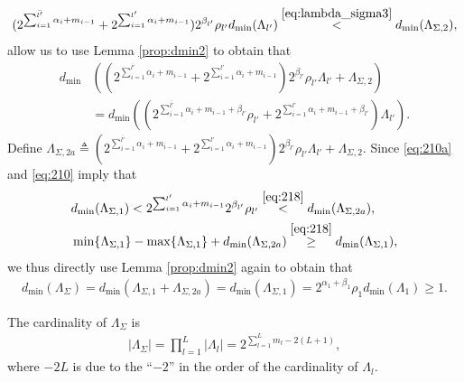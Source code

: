 \documentclass[12pt, draftclsnofoot, onecolumn]{IEEEtran}
\theoremstyle{definition}
\begin{document}
\begin{align}\label{eq:217}
(2^{\sum_{i=1}^{\bar{l'}}\alpha_i+m_{i-1}}+2^{\sum_{i=1}^{l'}\alpha_i+m_{i-1}})2^{\beta_{l'}}\rho_{l'}d_{\min}(\Lambda_{l'})\overset{\eqref{eq:lambda_sigma3}}{<}d_{\min}(\Lambda_{\Sigma,2}),
\end{align}
allow us to use Lemma \ref{prop:dmin2} to obtain that
\begin{align}\label{eq:218}
d_{\min}&\left( (2^{\sum_{i=1}^{\bar{l'}}\alpha_i+m_{i-1}}+2^{\sum_{i=1}^{l'}\alpha_i+m_{i-1}})2^{\beta_{l'}}\rho_{l'}\Lambda_{l'}+ \Lambda_{\Sigma,2}\right) \nonumber \\
&= d_{\min}\left((2^{\sum_{i=1}^{\bar{l'}}\alpha_i+m_{i-1}+\beta_{l'}}\rho_{l'}+2^{\sum_{i=1}^{l'}\alpha_i+m_{i-1}+\beta_{l'}})\Lambda_{l'}\right).
\end{align}
Define $\Lambda_{\Sigma,2a}\triangleq (2^{\sum_{i=1}^{\bar{l'}}\alpha_i+m_{i-1}}+2^{\sum_{i=1}^{l'}\alpha_i+m_{i-1}})2^{\beta_{l'}}\rho_{l'}\Lambda_{l'}+ \Lambda_{\Sigma,2}$. Since \eqref{eq:210a} and \eqref{eq:210} imply that
\begin{align}
&d_{\min}(\Lambda_{\Sigma,1}) <2^{\sum_{i=1}^{l'}\alpha_i+m_{i-1}}2^{\beta_{l'}}\rho_{l'}\overset{\eqref{eq:218}}{<} d_{\min}(\Lambda_{\Sigma,2a}), \label{eq:213} \\
&\min\{\Lambda_{\Sigma,1}\}-\max\{\Lambda_{\Sigma,1}\}+d_{\min}(\Lambda_{\Sigma,2a})\overset{\eqref{eq:218}}{\geq} d_{\min}(\Lambda_{\Sigma,1}),
\end{align}
we thus directly use Lemma \ref{prop:dmin2} again to obtain that
\begin{align}\label{eq:214}
d_{\min}( \Lambda_{\Sigma}) =d_{\min}\left(\Lambda_{\Sigma,1} +\Lambda_{\Sigma,2a}\right)=d_{\min}(\Lambda_{\Sigma,1}) =2^{\alpha_1+\beta_1}\rho_1d_{\min}(\Lambda_1)  \geq 1.
\end{align}

%

The cardinality of $\Lambda_{\Sigma}$ is
\begin{align}\label{eq:lambda_sigma_card}
|\Lambda_{\Sigma}| = \prod\limits_{l=1}^L|\Lambda_l|=2^{\sum_{l=1}^L m_l - 2(L+1)},
\end{align}
where $-2L$ is due to the ``$-2$'' in the order of the cardinality of $\Lambda_l$.
\end{document}
